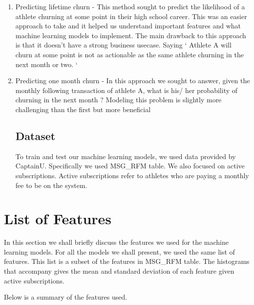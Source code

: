 \documentclass[
10pt, %
a4paper, %
oneside, %
headinclude,footinclude, %
BCOR5mm, %
]{scrartcl}
\begin{document}
\begin{enumerate}[noitemsep] %
\item Predicting lifetime churn - This method sought to predict the likelihood of a athlete churning at some point in their high school career. This was an easier approach to take and it helped us understand important features and what machine learning models to implement. The main drawback to this approach is that it doesn't have a strong business usecase. Saying ` Athlete A will churn at some point is not as actionable as the same athlete churning in the next month or two. `
\item Predicting one month churn -  In this approach we sought to answer, given the monthly following transaction of athlete A, what is his/ her probability of churning in the next month ? Modeling this problem is slightly more challenging than the first but more beneficial 

\subsection{Dataset}

To train and test our machine learning models, we used data provided by CaptainU. Specifically we used MSG\_RFM table. We also focused on active subscriptions. Active subscriptions refer to athletes who are paying a monthly fee to be on the system. 


\end{enumerate}

 \section{List of Features}
 
In this section we shall briefly discuss the features we used for the machine learning models. For all the models we shall present, we used the same list of features. This list is a subset of the features in MSG\_RFM table. The histograms that accompany gives the mean and standard deviation of each feature given active subscriptions.  

Below is a summary of the features used. 
\end{document}
